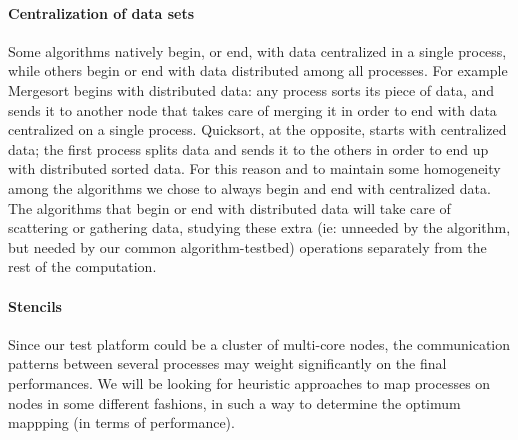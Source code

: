 \paragraph{Centralization of data sets} Some algorithms natively begin, or end, with data centralized in a single process, while others begin or end with data distributed among all processes. For example Mergesort begins with distributed data: any process sorts its piece of data, and sends it to another node that takes care of merging it in order to end with data centralized on a single process. Quicksort, at the opposite, starts with centralized data; the first process splits data and sends it to the others in order to end up with distributed sorted data. For this reason and to maintain some homogeneity among the algorithms we chose to always begin and end with centralized data. The algorithms that begin or end with distributed data will take care of scattering or gathering data, studying these extra (ie: unneeded by the algorithm, but needed by our common algorithm-testbed) operations separately from the rest of the computation.

\paragraph{Stencils} Since our test platform could be a cluster of multi-core nodes, the communication patterns between several processes may weight significantly on the final performances. We will be looking for heuristic approaches to map processes on nodes in some different fashions, in such a way to determine the optimum mappping (in terms of performance).

